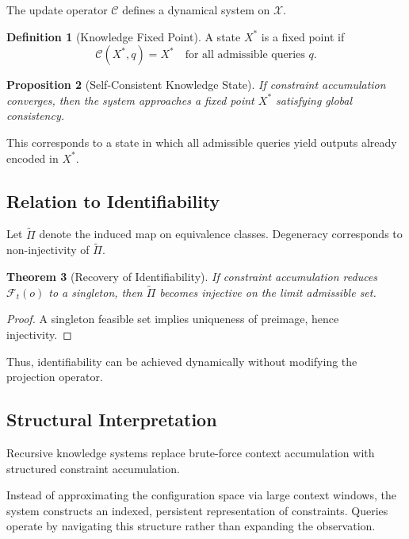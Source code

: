 \documentclass[12pt, oneside]{article}
\theoremstyle{plain}
\newtheorem{theorem}{Theorem}[section]
\newtheorem{proposition}[theorem]{Proposition}
\theoremstyle{definition}
\newtheorem{definition}[theorem]{Definition}
\theoremstyle{remark}
\begin{document}
The update operator $\mathcal{C}$ defines a dynamical system on $\mathcal{X}$.

\begin{definition}[Knowledge Fixed Point]
A state $X^*$ is a fixed point if
\[
\mathcal{C}(X^*, q) = X^* \quad \text{for all admissible queries } q.
\]
\end{definition}

\begin{proposition}[Self-Consistent Knowledge State]
If constraint accumulation converges, then the system approaches a fixed point $X^*$ satisfying global consistency.
\end{proposition}

This corresponds to a state in which all admissible queries yield outputs already encoded in $X^*$.

\subsection{Relation to Identifiability}

Let $\widetilde{\Pi}$ denote the induced map on equivalence classes. Degeneracy corresponds to non-injectivity of $\widetilde{\Pi}$.

\begin{theorem}[Recovery of Identifiability]
If constraint accumulation reduces $\mathcal{F}_t(o)$ to a singleton, then $\widetilde{\Pi}$ becomes injective on the limit admissible set.
\end{theorem}

\begin{proof}
A singleton feasible set implies uniqueness of preimage, hence injectivity.
\end{proof}

Thus, identifiability can be achieved dynamically without modifying the projection operator.

\subsection{Structural Interpretation}

Recursive knowledge systems replace brute-force context accumulation with structured constraint accumulation.

Instead of approximating the configuration space via large context windows, the system constructs an indexed, persistent representation of constraints. Queries operate by navigating this structure rather than expanding the observation.
\end{document}
